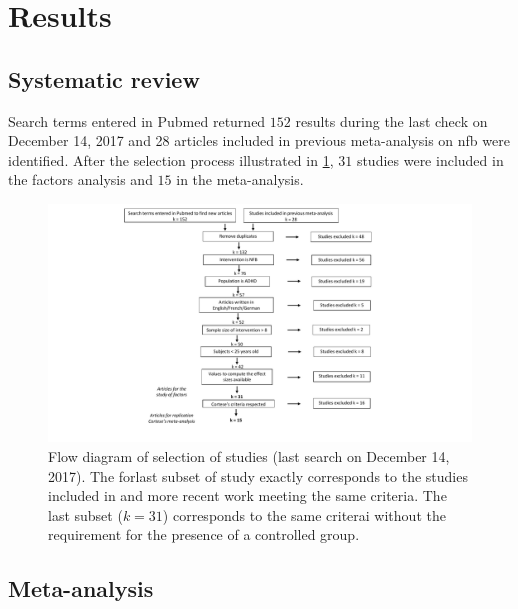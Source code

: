 


\section{Results}

\subsection{Systematic review}

Search terms entered in Pubmed returned $152$ results during the last check on December 14, 2017 and 28 articles included in previous
 meta-analysis on \gls{nfb} were identified. After the selection process illustrated in \cref{Figure:systematic_review_workflow}, 
 $31$ studies were included in the factors analysis and $15$ in the meta-analysis.

\begin{figure}[h!]
  \centering
  \includegraphics[width=1.0\linewidth]{figures/meta_review_factors_analysis_how_studies_are_included_no_colors_2-columns_fitting_ima}
  \caption{Flow diagram of selection of studies (last search on December 14, 2017). The forlast subset of study exactly corresponds to the studies included in \citet{Cortese2016} and more recent work meeting the same criteria. The last subset ($k=31$) corresponds to the same criterai without the requirement for the presence of a controlled group.}
  \label{Figure:systematic_review_workflow}
\end{figure}

\subsection{Meta-analysis}

